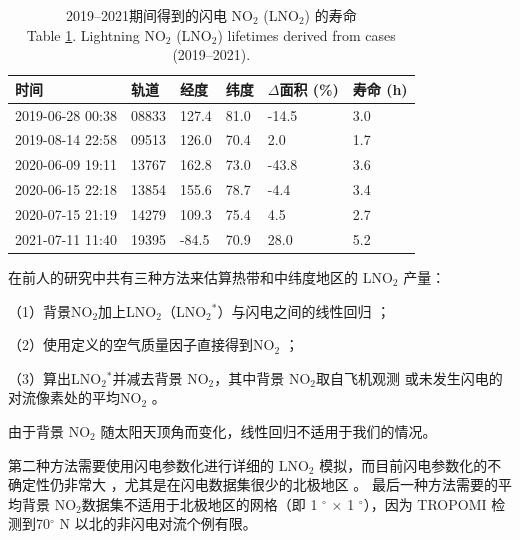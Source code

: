 \begin{table}[!htbp]
\centering
\caption{2019--2021期间得到的闪电 NO$_2$ (LNO$_2$) 的寿命\\
Table \ref{table:lifetime}. Lightning NO$_2$ (LNO$_2$) lifetimes derived from cases (2019--2021).}
\label{table:lifetime}
\begin{tabular}{llllll}
\hline
时间             &         轨道 &    经度 &   纬度 &  $\Delta$面积 (\%) &  寿命 (h) \\
\hline
2019-06-28 00:38 &       08833 &  127.4 &  81.0 &     -14.5 &       3.0 \\
2019-08-14 22:58 &       09513 &  126.0 &  70.4 &       2.0 &       1.7 \\
2020-06-09 19:11 &       13767 &  162.8 &  73.0 &     -43.8 &       3.6 \\
2020-06-15 22:18 &       13854 &  155.6 &  78.7 &      -4.4 &       3.4 \\
2020-07-15 21:19 &       14279 &  109.3 &  75.4 &       4.5 &       2.7 \\
2021-07-11 11:40 &       19395 &  -84.5 &  70.9 &      28.0 &       5.2 \\
\hline
\end{tabular}
\footnotesize
{}
\end{table}


在前人的研究中共有三种方法来估算热带和中纬度地区的 LNO$_2$ 产量：

（1）背景NO$_2$加上LNO$_2$（LNO$_2$$^*$）与闪电之间的线性回归 \citep{Pickering.2016,Allen.2019,Lapierre.2020}；

（2）使用定义的空气质量因子直接得到NO$_2$ \citep{Beirle.2009,Zhang.2020b,Zhang.2022a}；

（3）算出LNO$_2$$^*$并减去背景 NO$_2$，其中背景 NO$_2$取自飞机观测 \cite{Pickering.2016,Perez-Invernon.2022} 或未发生闪电的对流像素处的平均NO$_2$ \citep{Bucsela.2019,Bucsela.2010,Allen.2021a}。

由于背景 NO$_2$ 随太阳天顶角而变化，线性回归不适用于我们的情况。

第二种方法需要使用闪电参数化进行详细的 LNO$_2$ 模拟，而目前闪电参数化的不确定性仍非常大 \cite{Finney.2018,Romps.2019,Chen.2021a}，尤其是在闪电数据集很少的北极地区 \citep{Holzworth.2021}。
最后一种方法需要的平均背景 NO$_2$数据集不适用于北极地区的网格（即 1 $^{\circ}$ $\times$ 1 $^{\circ}$），因为 TROPOMI 检测到70$^{\circ}$ N 以北的非闪电对流个例有限。


